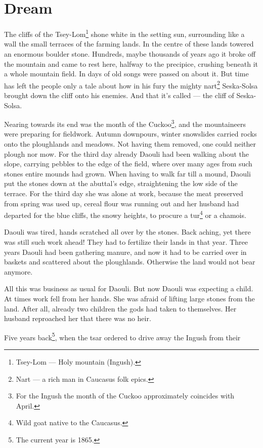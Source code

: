 \documentclass[smalldemyvopaper,11pt,twoside,onecolumn,openright,extrafontsizes]{memoir}
\begin{document}
\chapter{Dream}
The cliffs of the Tsey-Lom\footnote{Tsey-Lom — Holy mountain (Ingush).} shone white in the setting sun, surrounding
like a wall the small terraces of the farming lands. In the centre of these
lands towered an enormous boulder stone. Hundreds, maybe thousands of
years ago it broke off the mountain and came to rest here, halfway to the
precipice, crushing beneath it a whole mountain field. In days of old
songs were passed on about it. But time has left the people only a tale about
how in his fury the mighty nart\footnote{Nart — a rich man in Caucasus folk epics.}
Seska-Solsa brought down the cliff onto his enemies. 
And that it’s called — the cliff of Seska-Solsa.\par
Nearing towards its end was the month of the Cuckoo\footnote{For the Ingush the month of the Cuckoo approximately coincides with April.},
and the mountaineers were preparing for fieldwork. Autumn downpours, winter
snowslides carried rocks onto the ploughlands and meadows. Not having them removed,
one could neither plough nor mow. For the third day already Daouli
had been walking about the slope, carrying pebbles to the edge of the field,
where over many ages from such stones entire mounds had grown. When having to 
walk far till a mound, Daouli put the stones down at the abuttal’s
edge, straightening the low side of the terrace. For the third day she
was alone at work, because the meat preserved from spring was used up,
cereal flour was running out and her husband had departed for the blue
cliffs, the snowy heights, to procure a tur\footnote{Wild goat native to the
Caucasus.} or a chamois.\par
Daouli was tired, hands scratched all over by the stones. Back aching, yet
there was still such work ahead! They had to fertilize their lands in that year.
Three years Daouli had been gathering manure, and now it had to be carried over
in baskets and scattered about the ploughlands. Otherwise the land would not
bear anymore.\par
All this was business as usual for Daouli. But now Daouli was expecting a
child. At times work fell from her hands. She was afraid of lifting large
stones from the land. After all, already two children the gods had taken to
themselves. Her husband reproached her that there was no heir.\par
Five years back\footnote{The current year is 1865.}, when the tsar ordered to drive away the Ingush from their
\end{document}
